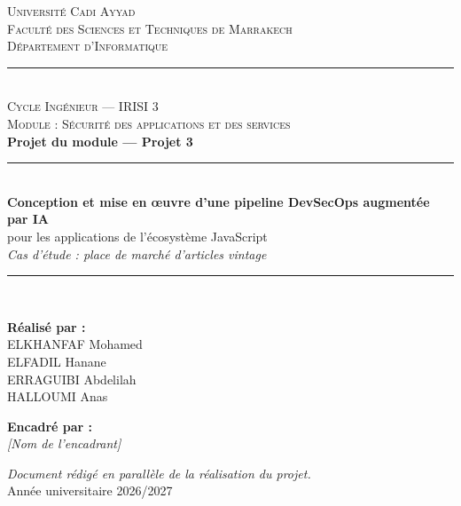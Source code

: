 \documentclass[11pt,a4paper,oneside]{report}
\begin{document}

\begin{titlepage}
\centering

{\large\scshape Université Cadi Ayyad}\\[2pt]
{\large\scshape Faculté des Sciences et Techniques de Marrakech}\\[2pt]
{\large\scshape Département d'Informatique}\\[4pt]
\rule{\textwidth}{1pt}\\[1.2cm]

{\scshape\large Cycle Ingénieur --- IRISI 3}\\[4pt]
{\scshape Module : Sécurité des applications et des services}\\[1.6cm]

{\Large\bfseries Projet du module --- Projet 3}\\[1.0cm]

\rule{0.85\textwidth}{0.6pt}\\[0.5cm]
{\huge\bfseries Conception et mise en œuvre d'une pipeline DevSecOps
augmentée par IA}\\[0.5cm]
{\LARGE pour les applications de l'écosystème JavaScript}\\[0.3cm]
{\large\itshape Cas d'étude : place de marché d'articles vintage}\\[0.4cm]
\rule{0.85\textwidth}{0.6pt}\\[1.8cm]

\begin{minipage}{0.45\textwidth}
\begin{flushleft}
\textbf{Réalisé par :}\\[4pt]
ELKHANFAF Mohamed\\
ELFADIL Hanane\\
ERRAGUIBI Abdelilah\\
HALLOUMI Anas
\end{flushleft}
\end{minipage}
\hfill
\begin{minipage}{0.45\textwidth}
\begin{flushright}
\textbf{Encadré par :}\\[4pt]
\textit{[Nom de l'encadrant]}
\end{flushright}
\end{minipage}

\vfill

{\small\itshape Document rédigé en parallèle de la réalisation du projet.}\\[2pt]
{\small Année universitaire 2026/2027}

\end{titlepage}
\end{document}
